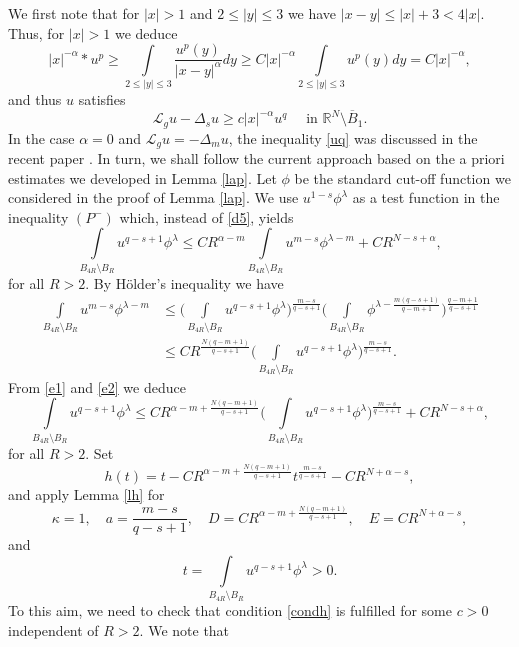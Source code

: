\documentclass[leqno,12pt]{article}
\numberwithin{equation}{section}
\newcommand{\Ro}{\mathbb R^N\setminus \overline B_1}
\newcommand{\Lg}{{\mathcal L}_g}
\begin{document}
We first note that for $|x|>1$ and $2\leq |y|\leq 3$ we have $|x-y|\leq |x|+3< 4|x|$. Thus, for $|x|>1$ we deduce
$$
|x|^{-\alpha}*u^p\geq \int\limits_{2\leq |y|\leq 3}\frac{u^p(y)}{|x-y|^\alpha} dy\geq C|x|^{-\alpha}\int\limits_{2\leq |y|\leq 3}u^p(y)dy=C|x|^{-\alpha},
$$
and thus $u$ satisfies
\begin{equation}\label{uq}
\Lg u-\Delta_s u\geq c|x|^{-\alpha}u^q \quad\mbox{ in }\Ro.
\end{equation}
In the case $\alpha=0$ and $\Lg u=-\Delta_mu$, the inequality \eqref{uq} was discussed in the recent paper \cite{BBF26}. In turn, we shall follow the current approach based on the a priori estimates we developed in Lemma \ref{lap}. Let $\phi$ be the standard cut-off function we considered in the proof of Lemma \ref{lap}. We use $u^{1-s}\phi^\lambda$ as a test function in the inequality $(P^-)$ which, instead of \eqref{d5}, yields 
\begin{equation}\label{e1}
\int\limits_{B_{4R}\setminus B_R} u^{q-s+1}\phi^\lambda \leq CR^{\alpha-m}\int\limits_{B_{4R}\setminus B_R} u^{m-s}\phi^{\lambda-m} +CR^{N-s+\alpha},
\end{equation}
for all $R>2$. By H\"older's inequality we have
\begin{equation}\label{e2}
\begin{aligned}
\int\limits_{B_{4R}\setminus B_R} u^{m-s}\phi^{\lambda-m}
&\leq \Big(\int\limits_{B_{4R}\setminus B_R} u^{q-s+1}\phi^{\lambda}\Big)^{\frac{m-s}{q-s+1}}\Big(\int\limits_{B_{4R}\setminus B_R} \phi^{\lambda-\frac{m(q-s+1)}{q-m+1}}\Big)^{\frac{q-m+1}{q-s+1}}\\
&\leq CR^{\frac{N(q-m+1)}{q-s+1}} \Big(\int\limits_{B_{4R}\setminus B_R} u^{q-s+1}\phi^{\lambda}\Big)^{\frac{m-s}{q-s+1}}.
\end{aligned}
\end{equation}
From \eqref{e1} and \eqref{e2} we deduce
\begin{equation}\label{e3}
\int\limits_{B_{4R}\setminus B_R} u^{q-s+1}\phi^\lambda \leq CR^{\alpha-m+\frac{N(q-m+1)}{q-s+1}} \Big(\int\limits_{B_{4R}\setminus B_R} u^{q-s+1}\phi^{\lambda}\Big)^{\frac{m-s}{q-s+1}}+CR^{N-s+\alpha},
\end{equation}
for all $R>2$. Set 
$$
h(t)=t-CR^{\alpha-m+\frac{N(q-m+1)}{q-s+1}} t^{\frac{m-s}{q-s+1}}-CR^{N+\alpha-s},
$$
and apply Lemma \ref{lh} for 
$$
\kappa=1,\quad a=\frac{m-s}{q-s+1},\quad D=CR^{\alpha-m+\frac{N(q-m+1)}{q-s+1}}, \quad E=CR^{N+\alpha-s},
$$
and
$$
t=\int\limits_{B_{4R}\setminus B_R} u^{q-s+1}\phi^\lambda>0.
$$
To this aim, we need to check that condition \eqref{condh} is fulfilled for some $c>0$ independent of $R>2$. We note that 
\end{document}
